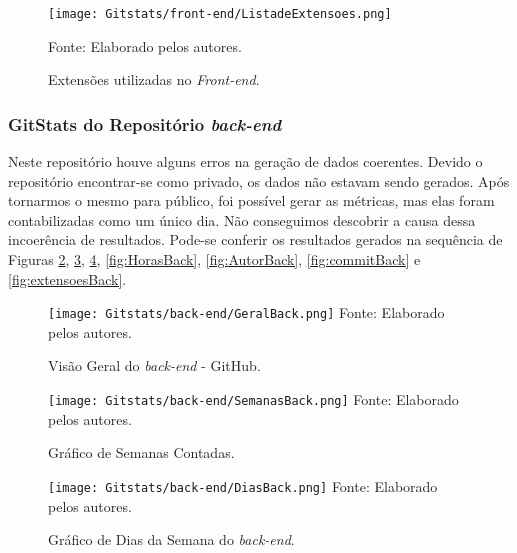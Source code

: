 \documentclass[
    12pt,               %
    openright,          %
    oneside,
    a4paper,            %
    BIBLATEX,           %
    TODO,               %
    english,            %
    brazil              %
    ]{ifsp-spo-inf-ctds}
\begin{document}
        \begin{figure}[H]
                \centering
                \caption{Extensões utilizadas no \emph{Front-end}.}
                \texttt{[image: Gitstats/front-end/ListadeExtensoes.png]}

                {\footnotesize Fonte: Elaborado pelos autores.}
                \label{fig:extensaoFront}
        \end{figure}  



        \subsubsection{GitStats do Repositório \emph{back-end}}

        Neste repositório houve alguns erros na geração de dados coerentes. Devido o repositório encontrar-se como privado, os dados não estavam sendo gerados. Após tornarmos o mesmo para público, foi possível gerar as métricas, mas elas foram contabilizadas como um único dia. Não conseguimos descobrir a causa dessa incoerência de resultados. 
        Pode-se conferir os resultados gerados na sequência de Figuras \ref{fig:geralBack}, \ref{fig:semanasBack}, \ref{fig:diasBack}, \ref{fig:HorasBack}, \ref{fig:AutorBack}, \ref{fig:commitBack} e \ref{fig:extensoesBack}.

            \begin{figure}[H]
                \centering
                \caption{Visão Geral do \emph{back-end} - GitHub.}
                \texttt{[image: Gitstats/back-end/GeralBack.png]}
                {\footnotesize Fonte: Elaborado pelos autores.}
                \label{fig:geralBack}
            \end{figure} 


            \begin{figure}[H]
                \centering
                \caption{Gráfico de Semanas Contadas.}
                \texttt{[image: Gitstats/back-end/SemanasBack.png]}
                {\footnotesize Fonte: Elaborado pelos autores.}
                \label{fig:semanasBack}
            \end{figure}   

            \begin{figure}[H]
                \centering
                \caption{Gráfico de Dias da Semana do \emph{back-end}.}
                \texttt{[image: Gitstats/back-end/DiasBack.png]}
                {\footnotesize Fonte: Elaborado pelos autores.}
                \label{fig:diasBack}
            \end{figure}
\end{document}
